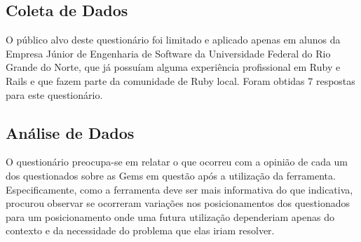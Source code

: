 \subsection{Coleta de Dados}

O público alvo deste questionário foi limitado e aplicado apenas em alunos da Empresa Júnior de Engenharia de Software da Universidade Federal do Rio Grande do Norte, que já possuíam alguma experiência profissional em Ruby e Rails e que fazem parte da comunidade de Ruby local. Foram obtidas 7 respostas para este questionário.

\subsection{Análise de Dados}

O questionário preocupa-se em relatar o que ocorreu com a opinião de cada um dos questionados sobre as Gems em questão após a utilização da ferramenta. Especificamente, como a ferramenta deve ser mais informativa do que indicativa, procurou observar se ocorreram variações nos posicionamentos dos questionados para um posicionamento onde uma futura utilização dependeriam apenas do contexto e da necessidade do problema que elas iriam resolver.